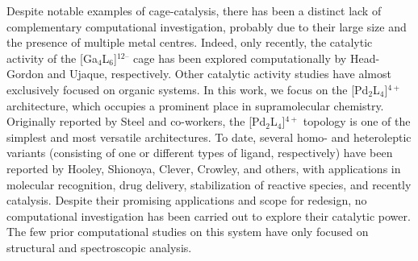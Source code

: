 \documentclass[../../main.tex]{subfiles}
\begin{document}
Despite notable examples of cage-catalysis, there has been a distinct lack of complementary computational investigation, probably due to their large size and the presence of multiple metal centres. Indeed, only recently, the catalytic activity of the [Ga$_4$L$_6$]$^{12–}$ cage has been explored computationally by Head-Gordon and Ujaque, respectively.\cite{VaissierWelborn2018, Norjmaa2019} Other catalytic activity studies have almost exclusively focused on organic systems.\cite{Pahima2019, Chakraborty2019, Goehry2015, Daver2017, Daver2018} In this work, we focus on the [Pd$_2$L$_4$]$^{4+}$ architecture, which occupies a prominent place in supramolecular chemistry.\cite{Lewis2012, Schmidt2014, Preston2016, Vasdev2017, Preston2017} Originally reported by Steel and co-workers,\cite{McMorran1998} the [Pd$_2$L$_4$]$^{4+}$ topology is one of the simplest and most versatile architectures.\cite{Schmidt2014, Vasdev2017} To date, several homo- and heteroleptic variants (consisting of one or different types of ligand, respectively) have been reported by Hooley,\cite{Liao2010} Shionoya,\cite{Clever2009} Clever,\cite{Bloch2017, Zhu2018, Li2019, Chen2019} Crowley,\cite{Lewis2013, McNeill2015} and others,\cite{Jansze2017, Chand2001, Kishi2011} with applications in molecular recognition,\cite{Kishi2011} drug delivery,\cite{Lewis2012} stabilization of reactive species,\cite{Yamashina2014} and recently catalysis.\cite{MartCentelles2018} Despite their promising applications and scope for redesign, no computational investigation has been carried out to explore their catalytic power. The few prior computational studies on this system have only focused on structural\cite{Preston2016} and spectroscopic analysis.\cite{Schmidt2016} 
\end{document}

